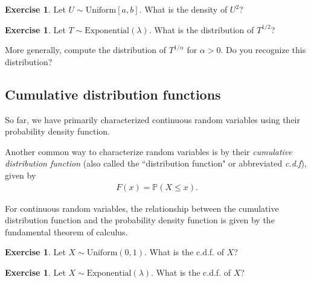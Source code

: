 \documentclass[11pt]{article}
\theoremstyle{definition}
\newtheorem{exercise}[]{Exercise}
\renewcommand{\P}{\mathbb{P}}
\begin{document}
\begin{exercise}
Let $U\sim \text{Uniform}[a, b]$. What is the density of $U^2$?
\end{exercise}


\begin{exercise}
Let $T \sim \text{Exponential}(\lambda)$. What is the distribution of
$T^{1/2}$?

More generally, compute the distribution of $T^{1/\alpha}$ for $\alpha > 0$.
Do you recognize this distribution?

\end{exercise}

\subsection{Cumulative distribution functions}

So far, we have primarily characterized continuous random
variables using their probability density function.

Another common way to characterize random variables is by
their \textit{cumulative distribution function} (also
called the ``distribution function" or abbreviated \textit{c.d.f}), given by
\begin{align}
  F(x) = \P(X \leq x).
  \label{eq:cdf}
\end{align}

For continuous random variables,
the relationship between the cumulative distribution
function and the probability density function is given
by the fundamental theorem of calculus.


\begin{exercise} Let $X\sim \text{Uniform}(0, 1)$.
  What is the c.d.f. of $X$?
\end{exercise}

\begin{exercise} Let $X\sim \text{Exponential}(\lambda)$.
  What is the c.d.f. of $X$?
\end{exercise}
\end{document}
